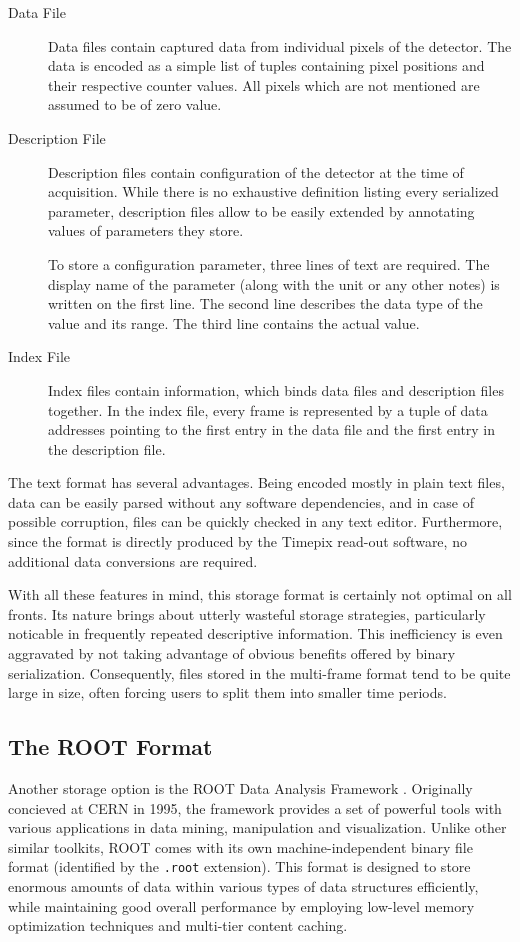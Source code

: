 \begin{description}
	\item[Data File]
	Data files contain captured data from individual pixels of the detector. The data is encoded as a simple list of tuples containing pixel positions and their respective counter values. All pixels which are not mentioned are assumed to be of zero value.

	\item[Description File]
	Description files contain configuration of the detector at the time of acquisition. While there is no exhaustive definition listing every serialized parameter, description files allow to be easily extended by annotating values of parameters they store.

	To store a configuration parameter, three lines of text are required. The display name of the parameter (along with the unit or any other notes) is written on the first line. The second line describes the data type of the value and its range. The third line contains the actual value.

	\item[Index File]
	Index files contain information, which binds data files and description files together. In the index file, every frame is represented by a tuple of data addresses pointing to the first entry in the data file and the first entry in the description file.
\end{description}

The text format has several advantages. Being encoded mostly in plain text files, data can be easily parsed without any software dependencies, and in case of possible corruption, files can be quickly checked in any text editor. Furthermore, since the format is directly produced by the Timepix read-out software, no additional data conversions are required.

With all these features in mind, this storage format is certainly not optimal on all fronts. Its nature brings about utterly wasteful storage strategies, particularly noticable in frequently repeated descriptive information. This inefficiency is even aggravated by not taking advantage of obvious benefits offered by binary serialization. Consequently, files stored in the multi-frame format tend to be quite large in size, often forcing users to split them into smaller time periods.

\subsection{The ROOT Format}
Another storage option is the ROOT Data Analysis Framework \cite{Brun199781}. Originally concieved at CERN in 1995, the framework provides a set of powerful tools with various applications in data mining, manipulation and visualization. Unlike other similar toolkits, ROOT comes with its own machine-independent binary file format (identified by the \texttt{.root} extension). This format is designed to store enormous amounts of data within various types of data structures efficiently, while maintaining good overall performance by employing low-level memory optimization techniques and multi-tier content caching.

